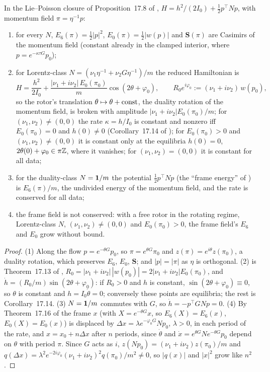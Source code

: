 \begin{theorem}
\label{d1:thm:closure}
In the Lie--Poisson closure of Proposition~17.8 of \cite{ES17}, $H=h^2/(2I_0)+\tfrac12p^{\!\top}Np$, with momentum field $\pi=\eta^{-1}p$:
\begin{enumerate}
\item for every $N$, $E_6(\pi)=\tfrac12|p|^2$, $E_0(\pi)=\tfrac12|w(p)|$ and $\mathbf S(\pi)$ are Casimirs of the momentum field (constant already in the
clamped interior, where $p=e^{-\kappa\tau G}p_0$);
\item for Lorentz-class $N=(\nu_1\eta^{-1}+\nu_2G\eta^{-1})/m$ the reduced Hamiltonian is
\[
H=\frac{h^2}{2I_0}+\frac{|\nu_1+i\nu_2|\,E_0(\pi_0)}m\cos(2\theta+\varphi_0),\qquad R_0e^{i\varphi_0}:=(\nu_1+i\nu_2)\,w(p_0),
\]
so the rotor's translation $\theta\mapsto\theta+{\rm const}$, the duality rotation of the momentum field, is broken with amplitude
$|\nu_1+i\nu_2|E_0(\pi_0)/m$; for $(\nu_1,\nu_2)\neq(0,0)$ the rate $\kappa=h/I_0$ is constant and nonzero iff $E_0(\pi_0)=0$ and $h(0)\neq0$
(Corollary~17.14 of \cite{ES17}); for $E_0(\pi_0)>0$ and $(\nu_1,\nu_2)\neq(0,0)$ it is constant only at the equilibria $h(0)=0$, $2\theta(0)+\varphi_0\in\pi\mathbb{Z}$, where it vanishes;
for $(\nu_1,\nu_2)=(0,0)$ it is constant for all data;
\item for the duality-class $N=\mathbf 1/m$ the potential $\tfrac12p^{\!\top}Np$ (the ``frame energy'' of \cite{ES17}) is $E_6(\pi)/m$, the undivided energy of
the momentum field, and the rate is conserved for all data;
\item the frame field is not conserved: with a free rotor in the rotating regime, Lorentz-class $N$, $(\nu_1,\nu_2)\neq(0,0)$ and $E_0(\pi_0)>0$, the
frame field's $E_6$ and $E_0$ grow without bound.
\end{enumerate}
\end{theorem}

\begin{proof}
(1) Along the flow $p=e^{-\theta G}p_0$, so $\pi=e^{\theta G}\pi_0$ and $z(\pi)=e^{i\theta}z(\pi_0)$, a duality rotation, which preserves $E_6$, $E_0$,
$\mathbf S$; and $|p|=|\pi|$ as $\eta$ is orthogonal. (2) is Theorem~17.13 of \cite{ES17}, $R_0=|\nu_1+i\nu_2|\,|w(p_0)|=2|\nu_1+i\nu_2|E_0(\pi_0)$,
and $\dot h=(R_0/m)\sin(2\theta+\varphi_0)$: if $R_0>0$ and $h$ is constant, $\sin(2\theta+\varphi_0)\equiv0$, so $\theta$ is constant and $h=I_0\dot\theta=0$;
conversely these points are equilibria; the rest is Corollary~17.14. (3) $N=\mathbf 1/m$ commutes with $G$, so $\dot h=-p^{\!\top}GNp=0$. (4) By
Theorem~17.16 of \cite{ES17} the frame $x$ (with $X=e^{-\theta G}x$, so $E_6(X)=E_6(x)$, $E_0(X)=E_0(x)$) is displaced by $\Delta x=\lambda e^{-\varphi_0G}Np_0$,
$\lambda>0$, in each period of the rate, and $x=x_0+n\Delta x$ after $n$ periods, since $\dot\theta$ and $\dot x=e^{\theta G}Ne^{-\theta G}p_0$ depend on
$\theta$ with period $\pi$. Since $G$ acts as $i$, $z(Np_0)=(\nu_1+i\nu_2)z(\pi_0)/m$
and $q(\Delta x)=\lambda^2e^{-2i\varphi_0}(\nu_1+i\nu_2)^2q(\pi_0)/m^2\neq0$, so $|q(x)|$ and $|x|^2$ grow like $n^2$.
\end{proof}

